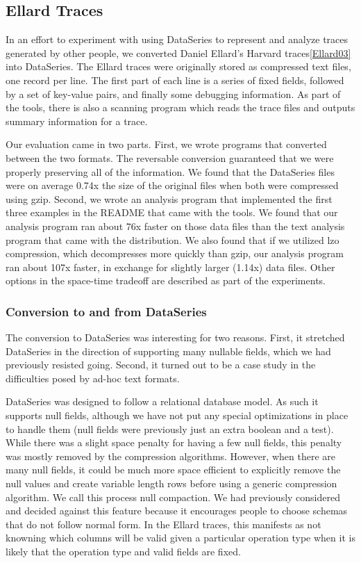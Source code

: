 \subsection{Ellard Traces}

In an effort to experiment with using DataSeries to represent and
analyze traces generated by other people, we converted Daniel Ellard's
Harvard traces\ref{Ellard03} into DataSeries.  The Ellard traces
were originally stored as compressed text files, one record per line.
The first part of each line is a series of fixed fields, followed by a
set of key-value pairs, and finally some debugging information.  As
part of the tools, there is also a scanning program which reads the
trace files and outputs summary information for a trace.

Our evaluation came in two parts.  First, we wrote programs that
converted between the two formats.  The reversable conversion
guaranteed that we were properly preserving all of the information.
We found that the DataSeries files were on average 0.74x the size of
the original files when both were compressed using gzip.  Second, we
wrote an analysis program that implemented the first three examples in
the README that came with the tools.  We found that our analysis
program ran about 76x faster on those data files than the text
analysis program that came with the distribution.  
We also found that if we utilized lzo compression, which decompresses
more quickly than gzip,
our analysis program
ran about 107x faster, in exchange for slightly larger (1.14x) data files.
Other options in the space-time
tradeoff are described as part of the experiments.

\subsubsection{Conversion to and from DataSeries}

The conversion to DataSeries was interesting for two reasons.  First,
it stretched DataSeries in the direction of supporting many nullable
fields, which we had previously resisted going.  Second, it turned out
to be a case study in the difficulties posed by ad-hoc text formats.

DataSeries was designed to follow a relational database model.  As
such it supports null fields, although we have not put any special
optimizations in place to handle them (null fields were previously
just an extra boolean and a test).  While there was a slight space
penalty for having a few null fields, this penalty was mostly removed
by the compression algorithms.  However, when there are many null
fields, it could be much more space efficient to explicitly remove the
null values and create variable length rows before using a generic
compression algorithm.  We call this process null compaction.  We had
previously considered and decided against this feature because it
encourages people to choose schemas that do not follow normal form.
In the Ellard traces, this manifests as not knowning which columns
will be valid given a particular operation type when it is likely that
the operation type and valid fields are fixed.

